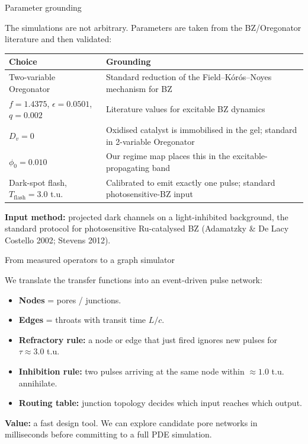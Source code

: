 \documentclass[aspectratio=169,11pt]{beamer}
\begin{document}
\begin{frame}{Parameter grounding}

The simulations are not arbitrary. Parameters are taken from the BZ/Oregonator literature and then validated:

\vspace{0.3cm}
\begin{table}
\centering
\footnotesize
\begin{tabular}{p{3.5cm}p{8.5cm}}
\toprule
\textbf{Choice} & \textbf{Grounding} \\
\midrule
Two-variable Oregonator & Standard reduction of the Field--K\'{o}r\'{o}s--Noyes mechanism for BZ \\
$f = 1.4375$, $\epsilon = 0.0501$, $q = 0.002$ & Literature values for excitable BZ dynamics \\
$D_v = 0$ & Oxidised catalyst is immobilised in the gel; standard in 2-variable Oregonator \\
$\phi_0 = 0.010$ & Our regime map places this in the excitable-propagating band \\
Dark-spot flash, $T_{\text{flash}} = 3.0$ t.u. & Calibrated to emit exactly one pulse; standard photosensitive-BZ input \\
\bottomrule
\end{tabular}
\end{table}

\vspace{0.3cm}
\textbf{Input method:} projected dark channels on a light-inhibited background, the standard protocol for photosensitive Ru-catalysed BZ (Adamatzky \& De Lacy Costello 2002; Stevens 2012).

\end{frame}

\begin{frame}{From measured operators to a graph simulator}

We translate the transfer functions into an event-driven pulse network:

\vspace{0.3cm}
\begin{itemize}
    \item \textbf{Nodes} = pores / junctions.
    \item \textbf{Edges} = throats with transit time $L/c$.
    \item \textbf{Refractory rule:} a node or edge that just fired ignores new pulses for $\tau \approx 3.0$ t.u.
    \item \textbf{Inhibition rule:} two pulses arriving at the same node within $\approx 1.0$ t.u. annihilate.
    \item \textbf{Routing table:} junction topology decides which input reaches which output.
\end{itemize}

\vspace{0.3cm}
\textbf{Value:} a fast design tool. We can explore candidate pore networks in milliseconds before committing to a full PDE simulation.

\end{frame}
\end{document}
